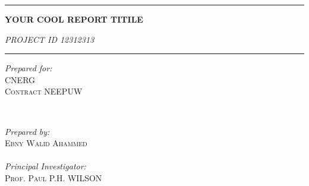 \begin{titlepage} %
    \newcommand{\HRule}{\rule{\linewidth}{0.5mm}} %
    
    \center %

    \HRule
    \vspace{0.1cm}
        \begin{minipage}{0.8\textwidth}
        {\begin{center}\huge\bfseries YOUR COOL REPORT TITILE
                           \end{center}}
        {\begin{center}\large\textit{PROJECT ID 12312313}\end{center}}
        \end{minipage}

    \vspace{0.2cm}
    \HRule
    \vspace{0.5cm}
    
       \begin{minipage}{0.4\textwidth}
               \begin{flushleft}
                       \large
                       \textit{Prepared for:}\\
                       \textsc{CNERG}\\ %
                        \textsc{Contract} NEEPUW\\ %
                \end{flushleft}
       \end{minipage}
       ~
       \begin{minipage}{0.4\textwidth}
               \begin{flushright}
                       \large
                       \textit{Prepared by:}\\
                       \textsc{Ebny Walid Ahammed}\\ %
                       \vspace{4mm}\\
                       \textit{Principal Investigator:}\\ %
                       \textsc{Prof. Paul P.H. WILSON}\\
               \end{flushright}
    \end{minipage}
    

\end{titlepage}
